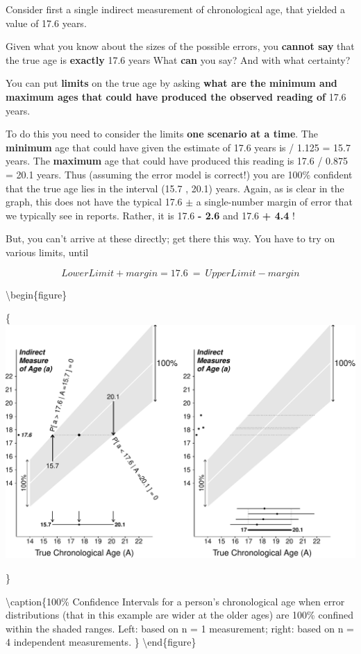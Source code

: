 \documentclass[
]{article}
\begin{document}
Consider first a single indirect measurement of chronological age, that
yielded a value of 17.6 years.

Given what you know about the sizes of the possible errors, you
\textbf{cannot say} that the true age is \textbf{exactly} 17.6 years
What \textbf{can} you say? And with what certainty?

You can put \textbf{limits} on the true age by asking \textbf{what are
the minimum and maximum ages that could have produced the observed
reading of} 17.6 years.

To do this you need to consider the limits \textbf{one scenario at a
time}. The \textbf{minimum} age that could have given the estimate of
17.6 years is / 1.125 = 15.7 years. The \textbf{maximum} age that could
have produced this reading is 17.6 / 0.875 = 20.1 years. Thus (assuming
the error model is correct!) you are 100\% confident that the true age
lies in the interval (15.7 , 20.1) years. Again, as is clear in the
graph, this does not have the typical 17.6 \(\pm\) a single-number
margin of error that we typically see in reports. Rather, it is 17.6
\textbf{- 2.6} and 17.6 \textbf{+ 4.4} !

But, you can't arrive at these directly; get there this way. You have to
try on various limits, until

\[ LowerLimit + margin  = 17.6 \ = \   UpperLimit - margin  \]

\textbackslash begin\{figure\}

\{\centering \includegraphics{hanley-ci_files/figure-latex/unnamed-chunk-3-1}

\}

\textbackslash caption\{100\% Confidence Intervals for a person's
chronological age when error distributions (that in this example are
wider at the older ages) are 100\% confined within the shaded ranges.
Left: based on n = 1 measurement; right: based on n = 4 independent
measurements. \}\label{fig:unnamed-chunk-3} \textbackslash end\{figure\}
\end{document}
